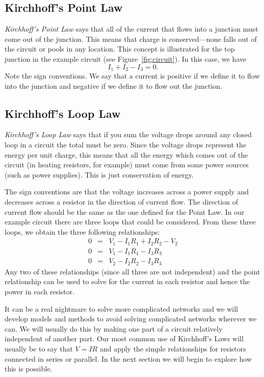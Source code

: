 \documentclass{article}
\begin{document}
\subsection{Kirchhoff's Point Law}
\emph{Kirchhoff's Point Law} says that all of the current that flows into a junction must come out of the junction. This means that charge is conserved---none falls out of the circuit or pools in any location. This concept is illustrated for the top junction in the example circuit (see Figure~\ref{fig:circuit}). In this case, we have
\begin{equation}
 I_1 + I_2 - I_3 = 0.
\end{equation}
Note the sign conventions. We say that a current is positive if we define it to flow into the junction and negative if we define it to flow out the junction.

\subsection{Kirchhoff's Loop Law}
\emph{Kirchhoff's Loop Law} says that if you sum the voltage drops around any closed loop in a circuit the total must be zero. Since the voltage drops represent the energy per unit charge, this means that all the energy which comes out of the circuit (in heating resistors, for example) must come from some power sources (such as power supplies). This is just conservation of energy. 

The sign conventions are that the voltage increases across a power supply and decreases across a resistor in the direction of current flow. The direction of current flow should be the same as the one defined for the Point Law. In our example circuit there are three loops that could be considered. From these three loops, we obtain the three following relationships:
\begin{eqnarray}
 0 & = & V_1 - I_1 R_1 + I_2 R_2 - V_2 \\
 0 & = & V_1 - I_1 R_1 - I_3 R_3 \\
 0 & = & V_2 - I_2 R_2 - I_3 R_3
\end{eqnarray}
Any two of these relationships (since all three are not independent) and the point relationship can be used to solve for the current in each resistor and hence the power in each resistor. 

It can be a real nightmare to solve more complicated networks and we will develop models and methods to avoid solving complicated networks wherever we can. We will usually do this by making one part of a circuit relatively independent of another part. Our most common use of Kirchhoff's Laws will usually be to say that $V = I R$ and apply the simple relationships for resistors connected in series or parallel. In the next section we will begin to explore how this is possible. 
\end{document}
